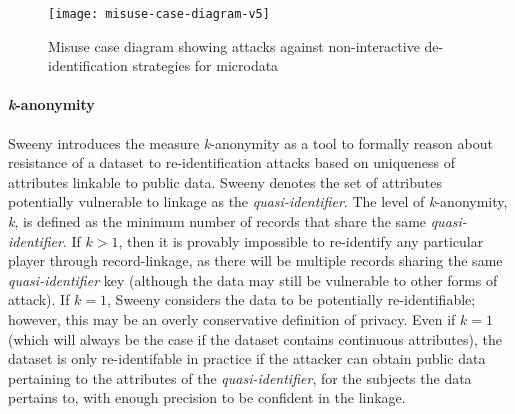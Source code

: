 \begin{figure}[h]
  \centering
  \texttt{[image: misuse-case-diagram-v5]}
  \caption{Misuse case diagram showing attacks against non-interactive de-identification strategies for microdata}
  \label{fig:misuse-case}
\end{figure}

\paragraph{\textit{k}-anonymity}

Sweeny \cite{Sweeny2002} introduces the measure \textit{k}-anonymity as a tool to formally reason about resistance of a dataset to re-identification attacks based on uniqueness of attributes linkable to public data. Sweeny denotes the set of attributes potentially vulnerable to linkage as the \textit{quasi-identifier}. The level of \textit{k}-anonymity, \textit{k}, is defined as the minimum number of records that share the same \textit{quasi-identifier}. If $k>1$, then it is provably impossible to re-identify any particular player through record-linkage, as there will be multiple records sharing the same \textit{quasi-identifier} key (although the data may still be vulnerable to other forms of attack). If $k=1$, Sweeny considers the data to be potentially re-identifiable; however, this may be an overly conservative definition of privacy. Even if $k=1$ (which will always be the case if the dataset contains continuous attributes), the dataset is only re-identifable in practice if the attacker can obtain public data pertaining to the attributes of the \textit{quasi-identifier}, for the subjects the data pertains to, with enough precision to be confident in the linkage.




